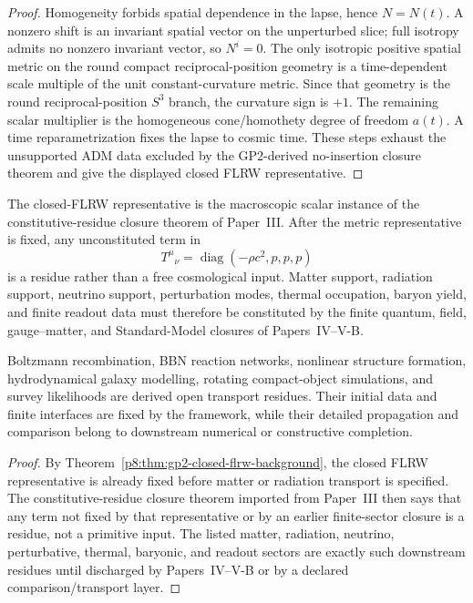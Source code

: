 \documentclass[12pt,a4paper]{article}
\begin{document}
\begin{proof}
Homogeneity forbids spatial dependence in the lapse, hence \(N=N(t)\).  A nonzero shift is an invariant spatial vector on the unperturbed slice; full isotropy admits no nonzero invariant vector, so \(N^i=0\).  The only isotropic positive spatial metric on the round compact reciprocal-position geometry is a time-dependent scale multiple of the unit constant-curvature metric.  Since that geometry is the round reciprocal-position \(S^3\) branch, the curvature sign is \(+1\).  The remaining scalar multiplier is the homogeneous cone/homothety degree of freedom \(a(t)\).  A time reparametrization fixes the lapse to cosmic time.  These steps exhaust the unsupported ADM data excluded by the GP2-derived no-insertion closure theorem and give the displayed closed FLRW representative.
\end{proof}
\begin{corollary}
\label{p8:cor:flrw-source-pressure-open-residues}
The closed-FLRW representative is the macroscopic scalar instance of the
constitutive-residue closure theorem of Paper~III.  After the metric
representative is fixed, any unconstituted term in
\[
T^\mu{}_{\nu}=\operatorname{diag}(-\rho c^2,p,p,p)
\]
is a residue rather than a free cosmological input.  Matter support, radiation
support, neutrino support, perturbation modes, thermal occupation, baryon
yield, and finite readout data must therefore be constituted by the finite
quantum, field, gauge--matter, and Standard-Model closures of Papers~IV--V-B.

Boltzmann recombination, BBN reaction networks, nonlinear structure formation, hydrodynamical galaxy modelling, rotating compact-object simulations, and survey likelihoods are derived open transport residues.  Their initial data and finite interfaces are fixed by the framework, while their detailed propagation and comparison belong to downstream numerical or constructive completion.
\end{corollary}

\begin{proof}
By Theorem~\ref{p8:thm:gp2-closed-flrw-background}, the closed FLRW representative is already fixed before matter or radiation transport is specified.  The constitutive-residue closure theorem imported from Paper~III then says that any term not fixed by that representative or by an earlier finite-sector closure is a residue, not a primitive input.  The listed matter, radiation, neutrino, perturbative, thermal, baryonic, and readout sectors are exactly such downstream residues until discharged by Papers~IV--V-B or by a declared comparison/transport layer.
\end{proof}
\end{document}
